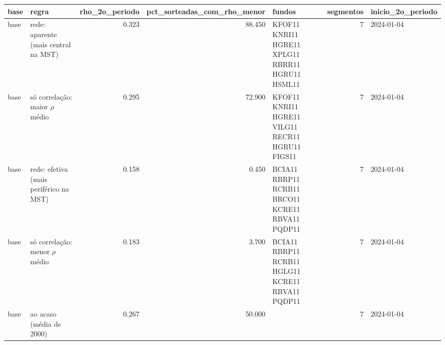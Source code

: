 \begin{tabular}{llrrlrl}
\toprule
base & regra & rho\_2o\_periodo & pct\_sorteadas\_com\_rho\_menor & fundos & segmentos & inicio\_2o\_periodo \\
\midrule
base & rede: aparente (mais central na MST) & 0.323 & 88.450 & KFOF11 KNRI11 HGRE11 XPLG11 RBRR11 HGRU11 HSML11 & 7 & 2024-01-04 \\
base & só correlação: maior $\rho$ médio & 0.295 & 72.900 & KFOF11 KNRI11 HGRE11 VILG11 RECR11 HGRU11 FIGS11 & 7 & 2024-01-04 \\
base & rede: efetiva (mais periférico na MST) & 0.158 & 0.450 & BCIA11 RBRP11 RCRB11 BRCO11 KCRE11 RBVA11 PQDP11 & 7 & 2024-01-04 \\
base & só correlação: menor $\rho$ médio & 0.183 & 3.700 & BCIA11 RBRP11 RCRB11 HGLG11 KCRE11 RBVA11 PQDP11 & 7 & 2024-01-04 \\
base & ao acaso (média de 2000) & 0.267 & 50.000 &  & 7 & 2024-01-04 \\
\bottomrule
\end{tabular}
